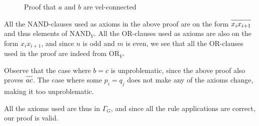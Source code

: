 \begin{figure}[h!]
  \begin{prooftree*}
  \end{prooftree*}
  \caption{Proof that $a$ and $b$ are vel-connected}
  \label{fig:general_vel_proof}
\end{figure}

All the NAND-clauses used as axioms in the above proof are on the form $\ol{x_ix_{i+1}}$ and thus elements of $\text{NAND}_V$.
All the OR-clauses used as axioms are also on the form $x_ix_{i+1}$, and since $n$ is odd and $m$ is even, we see that all the OR-clauses used in the proof are indeed from $\text{OR}_V$.

Observe that the case where $b = c$ is unproblematic, since the above proof also proves $\ol{ac}$.
The case where some $p_i = q_j$ does not make any of the axioms change, making it too unproblematic.

All the axioms used are thus in $\Gamma_G$, and since all the rule applications are correct, our proof is valid.
